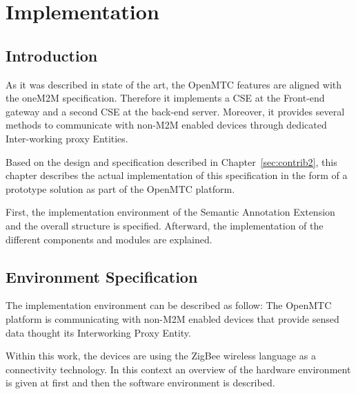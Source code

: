 \cleardoublepage
\chapter{Implementation}\label{sec:contrib3}\minitoc\vspace{.5cm}




\section{Introduction}
As it was described in state of the art, the OpenMTC features are aligned with the oneM2M specification. Therefore it implements a CSE at the Front-end gateway and a second CSE at the back-end server. Moreover, it provides several methods to communicate with non-M2M enabled devices through dedicated Inter-working proxy Entities. \par 
Based on the design and specification described in Chapter~\ref{sec:contrib2}, this chapter describes the actual implementation of this specification in the form of a prototype solution as part of the OpenMTC platform.\par 
First, the implementation environment of the Semantic Annotation Extension and the overall structure is specified. Afterward, the implementation of the different components and modules are explained.

\section{Environment Specification}

The implementation environment can be described as follow: The OpenMTC platform is communicating with non-M2M enabled devices that provide sensed data thought its Interworking Proxy Entity. \par 
Within this work, the devices are using the ZigBee wireless language as a connectivity technology. In this context an overview of the hardware environment is given at first and then the software environment is described.
